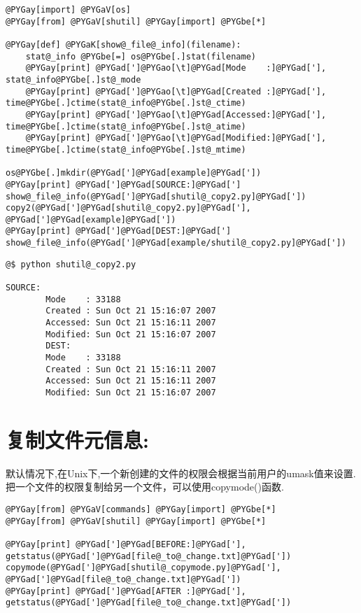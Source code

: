 \documentclass[a4paper,10pt,english]{manual}
\begin{document}
\begin{Verbatim}[commandchars=@\[\]]
@PYGay[import] @PYGaV[os]
@PYGay[from] @PYGaV[shutil] @PYGay[import] @PYGbe[*]

@PYGay[def] @PYGaK[show@_file@_info](filename):
    stat@_info @PYGbe[=] os@PYGbe[.]stat(filename)
    @PYGay[print] @PYGad[']@PYGao[\t]@PYGad[Mode    :]@PYGad['], stat@_info@PYGbe[.]st@_mode
    @PYGay[print] @PYGad[']@PYGao[\t]@PYGad[Created :]@PYGad['], time@PYGbe[.]ctime(stat@_info@PYGbe[.]st@_ctime)
    @PYGay[print] @PYGad[']@PYGao[\t]@PYGad[Accessed:]@PYGad['], time@PYGbe[.]ctime(stat@_info@PYGbe[.]st@_atime)
    @PYGay[print] @PYGad[']@PYGao[\t]@PYGad[Modified:]@PYGad['], time@PYGbe[.]ctime(stat@_info@PYGbe[.]st@_mtime)

os@PYGbe[.]mkdir(@PYGad[']@PYGad[example]@PYGad['])
@PYGay[print] @PYGad[']@PYGad[SOURCE:]@PYGad[']
show@_file@_info(@PYGad[']@PYGad[shutil@_copy2.py]@PYGad['])
copy2(@PYGad[']@PYGad[shutil@_copy2.py]@PYGad['], @PYGad[']@PYGad[example]@PYGad['])
@PYGay[print] @PYGad[']@PYGad[DEST:]@PYGad[']
show@_file@_info(@PYGad[']@PYGad[example/shutil@_copy2.py]@PYGad['])
\end{Verbatim}

\begin{Verbatim}[commandchars=@\[\]]
@$ python shutil@_copy2.py

SOURCE:
        Mode    : 33188
        Created : Sun Oct 21 15:16:07 2007
        Accessed: Sun Oct 21 15:16:11 2007
        Modified: Sun Oct 21 15:16:07 2007
        DEST:
        Mode    : 33188
        Created : Sun Oct 21 15:16:11 2007
        Accessed: Sun Oct 21 15:16:11 2007
        Modified: Sun Oct 21 15:16:07 2007
\end{Verbatim}


\section{复制文件元信息:}

默认情况下,在Unix下,一个新创建的文件的权限会根据当前用户的umask值来设置.把一个文件的权限复制给另一个文件，可以使用copymode()函数.

\begin{Verbatim}[commandchars=@\[\]]
@PYGay[from] @PYGaV[commands] @PYGay[import] @PYGbe[*]
@PYGay[from] @PYGaV[shutil] @PYGay[import] @PYGbe[*]

@PYGay[print] @PYGad[']@PYGad[BEFORE:]@PYGad['], getstatus(@PYGad[']@PYGad[file@_to@_change.txt]@PYGad['])
copymode(@PYGad[']@PYGad[shutil@_copymode.py]@PYGad['], @PYGad[']@PYGad[file@_to@_change.txt]@PYGad['])
@PYGay[print] @PYGad[']@PYGad[AFTER :]@PYGad['], getstatus(@PYGad[']@PYGad[file@_to@_change.txt]@PYGad['])
\end{Verbatim}
\end{document}
